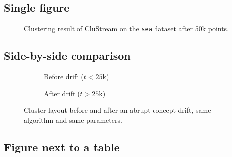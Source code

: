 \subsection{Single figure}

\begin{figure}[H]
\centering
\caption{Clustering result of CluStream on the \texttt{sea} dataset after
         50k points.}
\label{fig:single}
\end{figure}

\subsection{Side-by-side comparison}

\begin{figure}[H]
\centering
\begin{subfigure}[b]{0.48\linewidth}
  \centering
  \caption{Before drift ($t < 25$k)}
  \label{fig:before}
\end{subfigure}\hfill
\begin{subfigure}[b]{0.48\linewidth}
  \centering
  \caption{After drift ($t > 25$k)}
  \label{fig:after}
\end{subfigure}
\caption{Cluster layout before and after an abrupt concept drift, same
         algorithm and same parameters.}
\label{fig:compare}
\end{figure}

\subsection{Figure next to a table}

